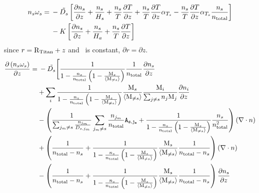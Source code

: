 \begin{equation}
\begin{split}
n_s\omega_s = &\: -\tilde{D_s} 
                        \left[\frac{\partial n_s}{\partial z} + \frac{n_s}{H_s} + 
                                \frac{n_s}{T}\frac{\partial T}{\partial z} + \frac{n_s}{T}\frac{\partial T}{\partial z}\alpha_{T_s} 
                                - \frac{n_s}{T}\frac{\partial T}{\partial z}\alpha_{T_s}\frac{n_s}{n_\text{total}}\right] \\
                  &\: - K \left[\frac{\partial n_s}{\partial z} + \frac{n_s}{H_a} + \frac{n_s}{T}\frac{\partial T}{\partial z}\right]
\end{split}
\end{equation}
since $r = \text{R}_\text{Titan} + z$ and \RTitan\ is constant, $\partial r = \partial z$.
\begin{equation}
\begin{split}
\dOverdz{\conc_s\omega_s} = 
                  &\: - \tilde{\diff_s}\Bigg[
                     \frac{1}{1-\frac{\conc_s}{\concAtm}  \left(1 - \frac{\Mm_s}{\mean{\Mm_{\neq s}}}\right)}
                                                        \frac{1}{\concAtm}\doverdz{\conc_s} \\
                  &  + \sum_i \frac{1}{1-\frac{\conc_s}{\concAtm}  \left(1 - \frac{\Mm_s}{\mean{\Mm_{\neq s}}}\right)}
                                      \frac{\Mm_s}{\mean{\Mm_{\neq s}}}\frac{\Mm_i}{\sum_{j\neq s}\conc_j\Mm_j}\doverdz{\conc_i} \\
                  & - \left(\frac{1}{\sum_{j_m \neq s}\frac{\conc_{j_m}}{\diff_{s,j_m}}}
                                       \sum_{j_m \neq s}\frac{\conc_{j_m}}{\concAtm}\A 
                              + \frac{1}{1-\frac{\conc_s}{\concAtm}  \left(1 - \frac{\Mm_s}{\mean{\Mm_{\neq s}}}\right)}
                                        \frac{\conc_s}{\concAtm^2}\right)\diverge{\conc} \\
                  & + \left( \frac{1}{\concAtm - \conc_s}
                                 + \frac{1}{1-\frac{\conc_s}{\concAtm}  \left(1 - \frac{\Mm_s}{\mean{\Mm_{\neq s}}}\right)}
                                      \frac{\Mm_s}{\mean{\Mm_{\neq s}}}\frac{1}{\concAtm - \conc_s}\right)\diverge{\conc} \\
                  & - \left( \frac{1}{\concAtm - \conc_s}
                                 + \frac{1}{1-\frac{\conc_s}{\concAtm}  \left(1 - \frac{\Mm_s}{\mean{\Mm_{\neq s}}}\right)}
                                      \frac{\Mm_s}{\mean{\Mm_{\neq s}}}\frac{1}{\concAtm - \conc_s}\right)\doverdz{\conc_s} \\

\end{split}
\end{equation}
